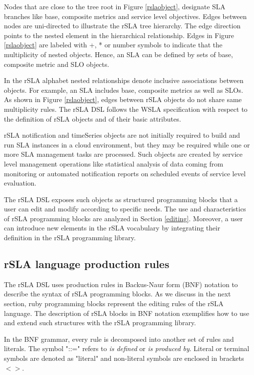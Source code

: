 Nodes that are close to the tree root in Figure \ref{rslaobject}, designate SLA branches like base, composite metrics and service level objectives. Edges between nodes are uni-directed to illustrate the rSLA tree hierarchy. The edge direction points to the nested element in the hierarchical relationship. 
Edges in Figure \ref{rslaobject} are labeled with +, * or number symbols to indicate that the multiplicity of nested objects. Hence, an SLA can be defined by sets of base, composite metric and SLO objects.

In the rSLA alphabet nested relationships denote inclusive associations between objects. For example, an SLA includes base, composite metrics as well as SLOs. As shown in Figure \ref{rslaobject}, edges between  rSLA objects do not share same multiplicity rules. The rSLA DSL follows the WSLA 
specification \cite{wsla} with respect to the definition of rSLA objects and of their basic attributes.

rSLA notification and timeSeries objects are not initially required to build and run SLA instances in a cloud environment, but they may be required while one or more SLA management tasks are processed. Such objects are created by service level management operations like statistical analysis of data coming from monitoring or automated notification reports on scheduled events of service level evaluation. 

The rSLA DSL exposes such objects as structured programming blocks that a user can edit and modify according to specific needs. The use and characteristics of rSLA programming blocks are analyzed in Section \ref{editing}. Moreover, a user can introduce new elements in the rSLA vocabulary by integrating their definition in the rSLA programming library. 

\subsection{rSLA language production rules}

The rSLA DSL uses production rules in Backus-Naur form (BNF) notation to describe the syntax of rSLA programming blocks. As we discuss in the next section, ruby programming blocks represent the editing rules of the rSLA language. The description of rSLA blocks in BNF notation exemplifies how to use and extend such structures with the rSLA programming library.

In the BNF grammar, every rule is decomposed into another set of rules and literals. The symbol "::=" refers to \textit{is defined} or \textit{is produced by}. Literal or terminal symbols are denoted as "literal" and non-literal symbols are enclosed in brackets $<>$.

